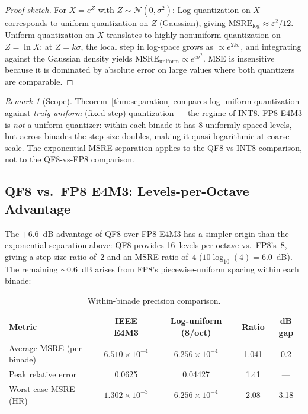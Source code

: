 \documentclass[11pt,letterpaper]{article}
\theoremstyle{definition}
\theoremstyle{remark}
\newtheorem{remark}[theorem]{Remark}
\newcommand{\MSRE}{\mathrm{MSRE}}
\begin{document}
\begin{proof}[Proof sketch]
For $X = e^Z$ with $Z \sim \mathcal{N}(0, \sigma^2)$:
Log quantization on $X$ corresponds to uniform quantization on $Z$ (Gaussian),
giving $\MSRE_{\log} \approx \varepsilon^2/12$.
Uniform quantization on $X$ translates to highly nonuniform quantization on
$Z = \ln X$: at $Z = k\sigma$, the local step in log-space grows as
$\propto e^{2k\sigma}$, and integrating against the Gaussian density yields
$\MSRE_{\mathrm{uniform}} \propto e^{c\sigma^2}$.
MSE is insensitive because it is dominated by absolute error on large values
where both quantizers are comparable.
\end{proof}

\begin{remark}[Scope]
\label{rem:separation-scope}
Theorem~\ref{thm:separation} compares log-uniform quantization against
\emph{truly uniform} (fixed-step) quantization --- the regime of INT8.
FP8 E4M3 is \emph{not} a uniform quantizer: within each binade it has 8
uniformly-spaced levels, but across binades the step size doubles, making it
quasi-logarithmic at coarse scale.
The exponential MSRE separation applies to the QF8-vs-INT8 comparison, not to
the QF8-vs-FP8 comparison.
\end{remark}

\subsection{QF8 vs.\ FP8 E4M3: Levels-per-Octave Advantage}
\label{subsec:qf8-vs-fp8}

The $+6.6$~dB advantage of QF8 over FP8 E4M3 has a simpler origin than the
exponential separation above: QF8 provides 16~levels per octave vs.\ FP8's~8,
giving a step-size ratio of~$2$ and an MSRE ratio of~$4$
($10\log_{10}(4) = 6.0$~dB).
The remaining ${\sim}0.6$~dB arises from FP8's piecewise-uniform spacing within
each binade:

\begin{table}[ht]
\centering
\caption{Within-binade precision comparison.}
\label{tab:qf8-vs-fp8-binade}
\begin{tabular}{@{}lcccc@{}}
\toprule
Metric & IEEE E4M3 & Log-uniform (8/oct) & Ratio & dB gap \\
\midrule
Average MSRE (per binade) & $6.510 \times 10^{-4}$ & $6.256 \times 10^{-4}$
  & 1.041 & 0.2 \\
Peak relative error & 0.0625 & 0.04427 & 1.41 & --- \\
Worst-case MSRE (HR) & $1.302 \times 10^{-3}$ & $6.256 \times 10^{-4}$
  & 2.08 & 3.18 \\
\bottomrule
\end{tabular}
\end{table}
\end{document}
